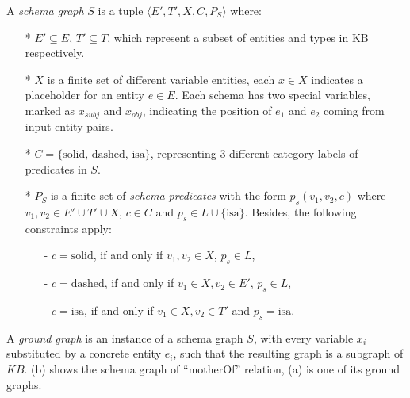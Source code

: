 \begin{defn}
A \textit{schema graph} $S$ is a tuple $\langle E', T', X, C, P_S \rangle$ where:
\begin{itemize}
  \item[*] $E' \subseteq E$, $T' \subseteq T$, which represent
  a subset of entities and types in KB respectively.
  \item[*] $X$ is a finite set of different variable entities, each $x \in X$
  indicates a placeholder for an entity $e \in E$. Each schema has
  two special variables, marked as $x_{subj}$ and $x_{obj}$,
  indicating the position of $e_1$ and $e_2$ coming from input entity pairs.
  \item[*] $C=\{\text{solid, dashed, isa}\}$, representing 3 different
  category labels of predicates in $S$.
  \item[*] $P_S$ is a finite set of \textit{schema predicates} with the
  form $p_s(v_1, v_2, c)$ where $v_1, v_2 \in E' \cup T' \cup X$, $c \in C$
  and $p_s \in L \cup \{\text{isa}\}$. Besides, the following constraints apply:
  \begin{itemize}
    \item[-] $c = \text{solid}$, if and only if $v_1, v_2 \in X$, $p_s \in L$,
    \item[-] $c = \text{dashed}$, if and only if $v_1 \in X, v_2 \in E'$, $p_s \in L$,
    \item[-] $c = \text{isa}$, if and only if $v_1 \in X, v_2 \in T'$ and $p_s = \text{isa}$.
  \end{itemize}

\end{itemize}
\end{defn}

A \textit{ground graph} is an instance of a schema graph $S$, with
every variable $x_i$ substituted by a concrete entity $e_i$,
such that the resulting graph is a subgraph of $KB$.
(b) shows the schema graph of ``motherOf'' relation,
(a) is one of its ground graphs.

